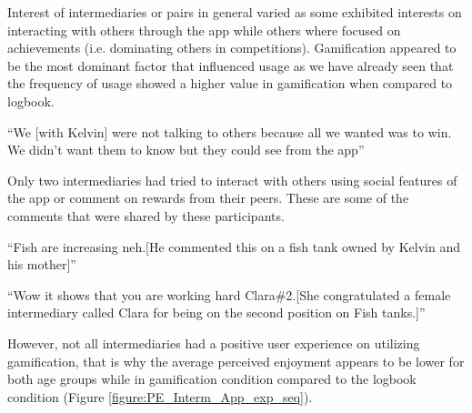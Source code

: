 \begin{enumerate}
Interest of intermediaries or pairs in general varied as some exhibited interests on interacting with others through the app while others where focused on achievements (i.e. dominating others in competitions). Gamification appeared to be the most dominant factor that influenced usage as we have already seen that the frequency of usage showed a higher value in gamification when compared to logbook. 

 {``We [with Kelvin] were not talking to others because all we wanted was to win. We didn't want them to know but they could see from the app''}
 
Only two intermediaries had tried to interact with others using social features of the app or comment on rewards from their peers. These are some of the comments that were shared by these participants.

 {``Fish are increasing neh.[He commented this on a fish tank owned by Kelvin and his mother]''} 

 {``Wow it shows that you are working hard  Clara\#2.[She congratulated a female intermediary called Clara for being on the second position on Fish tanks.]''} 

However, not all intermediaries had a positive user experience on utilizing gamification, that is why the average perceived enjoyment appears to be lower for both age groups while in gamification condition compared to the logbook condition (Figure \ref{figure:PE_Interm_App_exp_seq}).

\end{enumerate} 

